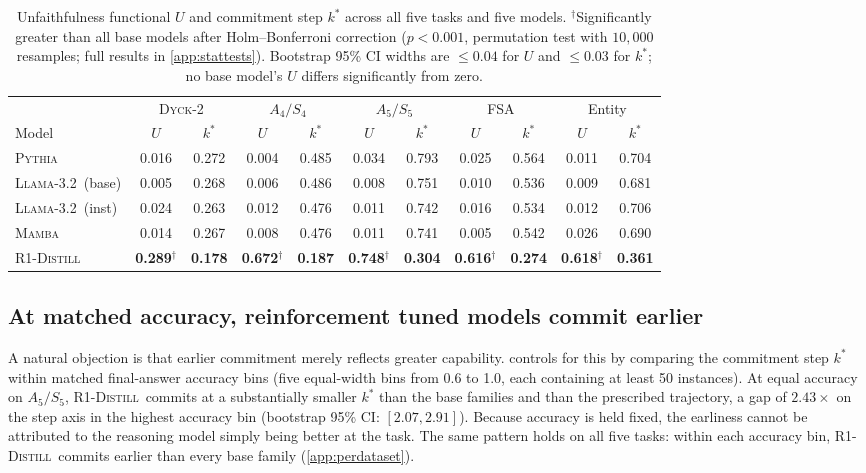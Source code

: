 \documentclass[11pt]{article}
\newcommand{\stepk}{k}
\newcommand{\Pythia}{\textsc{Pythia}}
\newcommand{\Llama}{\textsc{Llama-3.2}}
\newcommand{\Mamba}{\textsc{Mamba}}
\newcommand{\Rdistill}{\textsc{R1-Distill}}
\begin{document}
\begin{table}[t]
\centering
\small
\setlength{\tabcolsep}{3.5pt}
\begin{tabular}{@{}l cc cc cc cc cc@{}}
\toprule
& \multicolumn{2}{c}{\textsc{Dyck-2}}
& \multicolumn{2}{c}{$A_4/S_4$}
& \multicolumn{2}{c}{$A_5/S_5$}
& \multicolumn{2}{c}{FSA}
& \multicolumn{2}{c}{Entity} \\
\cmidrule(lr){2-3}\cmidrule(lr){4-5}\cmidrule(lr){6-7}\cmidrule(lr){8-9}\cmidrule(lr){10-11}
Model & $U$ & $\stepk^{*}$ & $U$ & $\stepk^{*}$ & $U$ & $\stepk^{*}$ & $U$ & $\stepk^{*}$ & $U$ & $\stepk^{*}$ \\
\midrule
\Pythia        & 0.016 & 0.272 & 0.004 & 0.485 & 0.034 & 0.793 & 0.025 & 0.564 & 0.011 & 0.704 \\
\Llama\ (base) & 0.005 & 0.268 & 0.006 & 0.486 & 0.008 & 0.751 & 0.010 & 0.536 & 0.009 & 0.681 \\
\Llama\ (inst) & 0.024 & 0.263 & 0.012 & 0.476 & 0.011 & 0.742 & 0.016 & 0.534 & 0.012 & 0.706 \\
\Mamba         & 0.014 & 0.267 & 0.008 & 0.476 & 0.011 & 0.741 & 0.005 & 0.542 & 0.026 & 0.690 \\
\Rdistill      & \textbf{0.289}$^{\dagger}$ & \textbf{0.178} & \textbf{0.672}$^{\dagger}$ & \textbf{0.187} & \textbf{0.748}$^{\dagger}$ & \textbf{0.304} & \textbf{0.616}$^{\dagger}$ & \textbf{0.274} & \textbf{0.618}$^{\dagger}$ & \textbf{0.361} \\
\bottomrule
\end{tabular}
\caption{Unfaithfulness functional $U$ and commitment step $\stepk^{*}$ across
all five tasks and five models. $^{\dagger}$Significantly greater than all base
models after Holm--Bonferroni correction ($p<0.001$, permutation test with
$10{,}000$ resamples; full results in \cref{app:stattests}). Bootstrap 95\% CI
widths are $\le 0.04$ for $U$ and $\le 0.03$ for $\stepk^{*}$; no base model's
$U$ differs significantly from zero.}
\label{tab:headline}
\end{table}

\subsection{At matched accuracy, reinforcement tuned models commit earlier}
\label{sec:results-matched}

A natural objection is that earlier commitment merely reflects greater
capability.  controls for this by comparing the
commitment step $\stepk^{*}$ within matched final-answer accuracy bins (five
equal-width bins from 0.6 to 1.0, each containing at least 50 instances). At
equal accuracy on $A_5/S_5$, \Rdistill\ commits at a substantially smaller
$\stepk^{*}$ than the base families and than the prescribed trajectory, a gap of
$2.43\times$ on the step axis in the highest accuracy bin (bootstrap 95\% CI:
$[2.07, 2.91]$). Because accuracy is held fixed, the earliness cannot be
attributed to the reasoning model simply being better at the task. The same
pattern holds on all five tasks: within each accuracy bin, \Rdistill\ commits
earlier than every base family (\cref{app:perdataset}).
\end{document}

